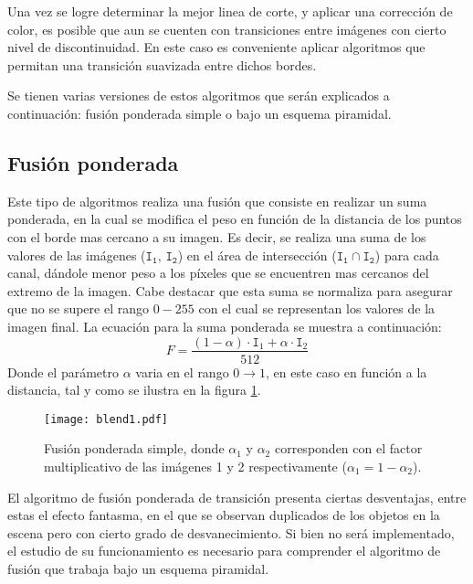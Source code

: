 Una vez se logre determinar la mejor linea de corte, y aplicar una corrección de color, es posible que aun se cuenten con transiciones entre imágenes con cierto nivel de discontinuidad. En este caso es conveniente aplicar algoritmos que permitan una transición suavizada entre dichos bordes.

Se tienen varias versiones de estos algoritmos que serán explicados a continuación: fusión ponderada simple o bajo un esquema piramidal.

\subsection{Fusión ponderada} \label{feathering}
Este tipo de algoritmos realiza una fusión que consiste en realizar un suma ponderada, en la cual se modifica el peso en función de la distancia de los puntos con el borde mas cercano a su imagen. Es decir, se realiza una suma de los valores de las imágenes ($\mathtt{I_1},\, \mathtt{I_2}$) en el área de intersección ($\mathtt{I_1}\cap \mathtt{I_2}$) para cada canal, dándole menor peso a los píxeles que se encuentren mas cercanos del extremo de la imagen. Cabe destacar que esta suma se normaliza para asegurar que no se supere el rango $0-255$ con el cual se representan los valores de la imagen final. La ecuación para la suma ponderada se muestra a continuación:
\begin{displaymath}
	F = \frac{(1-\alpha)\cdot \mathtt{I}_1 + \alpha\cdot \mathtt{I}_2}{512} 
\end{displaymath} 
Donde el parámetro $\alpha$ varia en el rango $0\to 1$, en este caso en función a la distancia, tal y como se ilustra en la figura \ref{imagen:blend-simple}.


\begin{figure}[h]
	\centering
	\texttt{[image: blend1.pdf]}
	\caption[Fusión ponderada simple]{Fusión ponderada simple, donde $\alpha_1$ y $\alpha_2$ corresponden con el factor multiplicativo de las imágenes 1 y 2 respectivamente ($\alpha_1 = 1 - \alpha_2$).}
	\label{imagen:blend-simple}
\end{figure}

El algoritmo de fusión ponderada de transición presenta ciertas desventajas, entre estas el efecto fantasma, en el que se observan duplicados de los objetos en la escena pero con cierto grado de desvanecimiento. Si bien no será implementado, el estudio de su funcionamiento es necesario para comprender el algoritmo de fusión que trabaja bajo un esquema piramidal.

